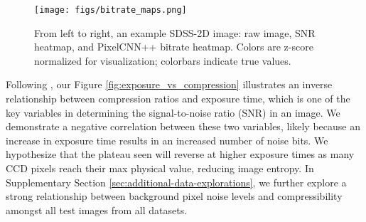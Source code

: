

\begin{figure}[t]
    \centering
    \texttt{[image: figs/bitrate\_maps.png]}
    \caption{
   From left to right, an example SDSS-2D image: raw image, SNR heatmap, and PixelCNN++ bitrate heatmap. Colors are z-score normalized for visualization; colorbars indicate true values.
    }
    \label{fig:bitrate_heatmap}
    \vspace{-1em}
\end{figure}



Following \citet{pence2009lossless}, our Figure \ref{fig:exposure_vs_compression} illustrates an inverse relationship between compression ratios and exposure time, which is one of the key variables in determining the signal-to-noise ratio (SNR) in an image. We demonstrate a negative correlation between these two variables, likely because an increase in exposure time results in an increased number of noise bits. We hypothesize that the plateau seen will reverse at higher exposure times as many CCD pixels reach their max physical value, reducing image entropy. In Supplementary Section \ref{sec:additional-data-explorations}, we further explore a strong relationship between background pixel noise levels and compressibility amongst all test images from all datasets.

